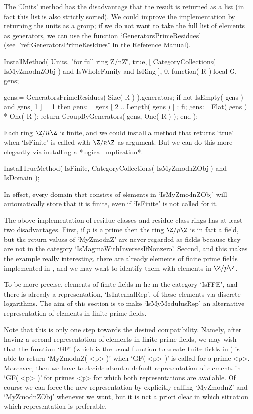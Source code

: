 The `Units' method has the disadvantage that the result is returned
as a list (in fact this list is also strictly sorted).
We could improve the implementation by returning the units as a group;
if we do not want to take the full list of elements as generators,
we can use the function `GeneratorsPrimeResidues'
(see~"ref:GeneratorsPrimeResidues" in the Reference Manual).

\begintt
InstallMethod( Units,
    "for full ring Z/nZ",
    true,
    [     CategoryCollections( IsMyZmodnZObj )
      and IsWholeFamily and IsRing ], 0,
    function( R )
    local G, gens;

    gens:= GeneratorsPrimeResidues( Size( R ) ).generators;
    if not IsEmpty( gens ) and gens[ 1 ] = 1 then
      gens:= gens{ [ 2 .. Length( gens ) ] };
    fi;
    gens:= Flat( gens ) * One( R );
    return GroupByGenerators( gens, One( R ) );
    end );
\endtt

Each ring $\Z/n\Z$ is finite,
and we could install a method that returns `true' when `IsFinite' is
called with $\Z/n\Z$ as argument.
But we can do this more elegantly via installing a *logical implication*.

\begintt
InstallTrueMethod( IsFinite,
    CategoryCollections( IsMyZmodnZObj ) and IsDomain );
\endtt

In effect, every domain that consists of elements in `IsMyZmodnZObj'
will automatically store that it is finite,
even if `IsFinite' is not called for it.



The above implementation of residue classes and residue class rings
has at least two disadvantages.
First, if $p$ is a prime then the ring $\Z/p\Z$ is in fact a field,
but the return values of `MyZmodnZ' are never regarded as fields because
they are not in the category `IsMagmaWithInversesIfNonzero'.
Second, and this makes the example really interesting,
there are already elements of finite prime fields implemented in {\GAP},
and we may want to identify them with elements in $\Z/p\Z$.

To be more precise,
elements of finite fields in {\GAP} lie in the category `IsFFE',
and there is already a representation, `IsInternalRep', of these elements
via discrete logarithms.
The aim of this section is to make `IsMyModulusRep' an alternative
representation of elements in finite prime fields.

Note that this is only one step towards the desired compatibility.
Namely, after having a second representation of elements in finite
prime fields, we may wish that the function `GF' (which is the usual
function to create finite fields in {\GAP}) is able to return
`MyZmodnZ( <p> )' when `GF( <p> )' is called for a prime <p>.
Moreover, then we have to decide about a default representation of
elements in `GF( <p> )' for primes <p> for which both representations are
available.
Of course we can force the new representation by explicitly calling
`MyZmodnZ' and `MyZmodnZObj' whenever we want, but it is not a priori
clear in which situation which representation is preferable.

